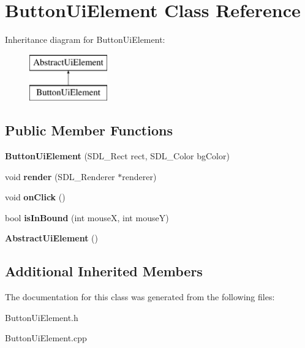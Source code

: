 \hypertarget{class_button_ui_element}{}\section{Button\+Ui\+Element Class Reference}
\label{class_button_ui_element}
Inheritance diagram for Button\+Ui\+Element\+:\begin{figure}[H]
\begin{center}
\leavevmode
\includegraphics[height=2.000000cm]{class_button_ui_element}
\end{center}
\end{figure}
\subsection*{Public Member Functions}
\begin{DoxyCompactItemize}
\item 
\mbox{\label{class_button_ui_element_a1347bd46d314e4c08e499d1d65bc85c1}} 
{\bfseries Button\+Ui\+Element} (S\+D\+L\+\_\+\+Rect rect, S\+D\+L\+\_\+\+Color bg\+Color)
\item 
\mbox{\label{class_button_ui_element_ad319e20e8abedefe07aef58a38ae9a81}} 
void {\bfseries render} (S\+D\+L\+\_\+\+Renderer $\ast$renderer)
\item 
\mbox{\label{class_button_ui_element_a06c748ef9e81216f76d7db936d320365}} 
void {\bfseries on\+Click} ()
\item 
\mbox{\label{class_button_ui_element_ab321d646770df66f7ea58a7246d7bf28}} 
bool {\bfseries is\+In\+Bound} (int mouseX, int mouseY)
\item 
\mbox{\label{class_button_ui_element_a24799afea36fcb1135b9477f1da3498d}} 
{\bfseries Abstract\+Ui\+Element} ()
\end{DoxyCompactItemize}
\subsection*{Additional Inherited Members}


The documentation for this class was generated from the following files\+:\begin{DoxyCompactItemize}
\item 
Button\+Ui\+Element.\+h\item 
Button\+Ui\+Element.\+cpp\end{DoxyCompactItemize}

